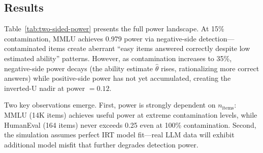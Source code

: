 \documentclass[11pt]{article}
\begin{document}
\subsection{Results}

\begin{table}[t]
\centering
\caption{Two-sided detection power across contamination levels (simulation). Values denote the proportion of simulated examinees detected at $\alpha = 0.05$. At low contamination, detection is primarily negative-side (aberrant); at high contamination, primarily positive-side (over-consistent). The crossover for MMLU occurs at $\pi \approx 0.28$.}
\label{tab:two-sided-power}
\end{table}

Table~\ref{tab:two-sided-power} presents the full power landscape.
At 15\% contamination, MMLU achieves 0.979 power via negative-side detection---contaminated items create aberrant ``easy items answered correctly despite low estimated ability'' patterns.
However, as contamination increases to 35\%, negative-side power decays (the ability estimate $\hat{\theta}$ rises, rationalizing more correct answers) while positive-side power has not yet accumulated, creating the inverted-U nadir at power $= 0.12$.

Two key observations emerge.
First, power is strongly dependent on $n_\text{items}$: MMLU (14K items) achieves useful power at extreme contamination levels, while HumanEval (164 items) never exceeds 0.25 even at 100\% contamination.
Second, the simulation assumes perfect IRT model fit---real LLM data will exhibit additional model misfit that further degrades detection power.
\end{document}

